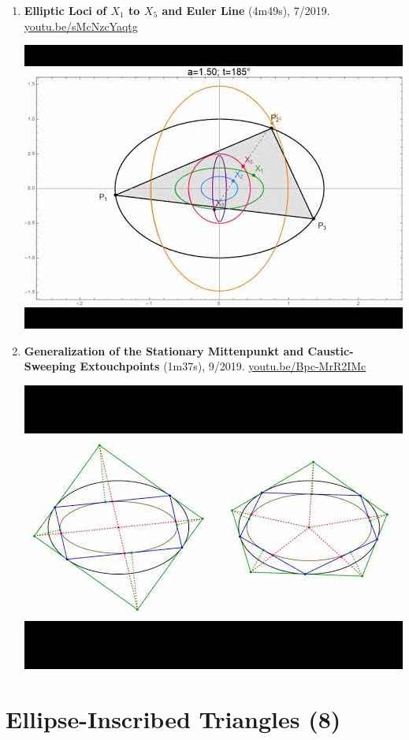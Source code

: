 \documentclass[12pt]{article}
\begin{document}
\begin{enumerate}[resume]
% 
\item \textbf{Elliptic Loci of $X_{1}$ to $X_{5}$ and Euler Line} (4m49s), 7/2019. \href{https://youtu.be/sMcNzcYaqtg}{\url{youtu.be/sMcNzcYaqtg}}
\begin{center}\includegraphics[width=.5\textwidth]{pics/sMcNzcYaqtg.jpg}\end{center}
% 
\item \textbf{Generalization of the Stationary Mittenpunkt and Caustic-Sweeping Extouchpoints} (1m37s), 9/2019. \href{https://youtu.be/Bpc-MrR2IMc}{\url{youtu.be/Bpc-MrR2IMc}}
\begin{center}\includegraphics[width=.5\textwidth]{pics/Bpc-MrR2IMc.jpg}\end{center}
% 
\end{enumerate}

\section{Ellipse-Inscribed Triangles (8)}
\end{document}
